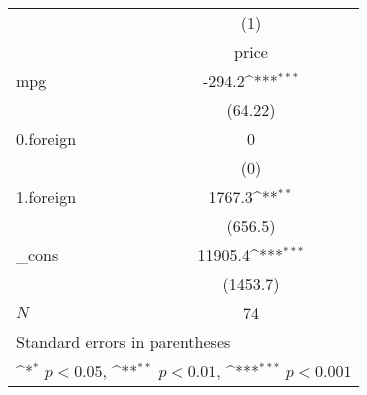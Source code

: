 {
\def\sym#1{\ifmmode^{#1}\else\(^{#1}\)\fi}
\begin{tabular}{l*{1}{c}}
\hline\hline
            &\multicolumn{1}{c}{(1)}\\
            &\multicolumn{1}{c}{price}\\
\hline
mpg         &      -294.2\sym{***}\\
            &     (64.22)         \\
[1em]
0.foreign   &           0         \\
            &         (0)         \\
[1em]
1.foreign   &      1767.3\sym{**} \\
            &     (656.5)         \\
[1em]
\_cons      &     11905.4\sym{***}\\
            &    (1453.7)         \\
\hline
\(N\)       &          74         \\
\hline\hline
\multicolumn{2}{l}{\footnotesize Standard errors in parentheses}\\
\multicolumn{2}{l}{\footnotesize \sym{*} \(p<0.05\), \sym{**} \(p<0.01\), \sym{***} \(p<0.001\)}\\
\end{tabular}
}
